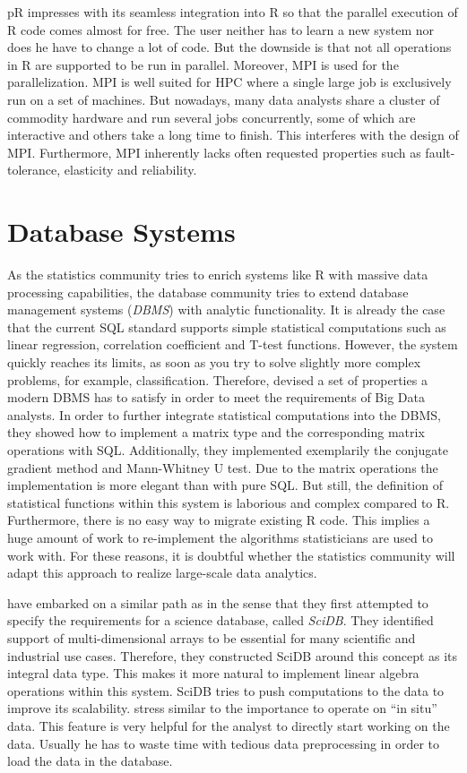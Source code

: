 pR impresses with its seamless integration into R so that the parallel execution of R code comes almost for free.
The user neither has to learn a new system nor does he have to change a lot of code.
But the downside is that not all operations in R are supported to be run in parallel.
Moreover, MPI is used for the parallelization.
MPI is well suited for HPC where a single large job is exclusively run on a set of machines.
But nowadays, many data analysts share a cluster of commodity hardware and run several jobs concurrently, some of which are interactive and others take a long time to finish.
This interferes with the design of MPI.
Furthermore, MPI inherently lacks often requested properties such as fault-tolerance, elasticity and reliability.

\section{Database Systems}

As the statistics community tries to enrich systems like R with massive data processing capabilities, the database community tries to extend database management systems (\emph{DBMS}) with analytic functionality.
It is already the case that the current SQL standard supports simple statistical computations such as linear regression, correlation coefficient and T-test functions.
However, the system quickly reaches its limits, as soon as you try to solve slightly more complex problems, for example, classification.
Therefore, \textcite{cohen:pve2009a} devised a set of properties a modern DBMS has to satisfy in order to meet the requirements of Big Data analysts.
In order to further integrate statistical computations into the DBMS, they showed how to implement a matrix type and the corresponding matrix operations with SQL.
Additionally, they implemented exemplarily the conjugate gradient method and Mann-Whitney U test.
Due to the matrix operations the implementation is more elegant than with pure SQL.
But still, the definition of statistical functions within this system is laborious and complex compared to R.
Furthermore, there is no easy way to migrate existing R code.
This implies a huge amount of work to re-implement the algorithms statisticians are used to work with.
For these reasons, it is doubtful whether the statistics community will adapt this approach to realize large-scale data analytics.

\Textcite{stonebraker:2009a} have embarked on a similar path as \citeauthor{cohen:pve2009a} in the sense that they first attempted to specify the requirements for a science database, called \emph{SciDB}.
They identified support of multi-dimensional arrays to be essential for many scientific and industrial use cases.
Therefore, they constructed SciDB around this concept as its integral data type.
This makes it more natural to implement linear algebra operations within this system.
SciDB tries to push computations to the data to improve its scalability.
\citeauthor{stonebraker:2009a} stress similar to \citeauthor{cohen:pve2009a} the importance to operate on ``in situ'' data.
This feature is very helpful for the analyst to directly start working on the data.
Usually he has to waste time with tedious data preprocessing in order to load the data in the database.


